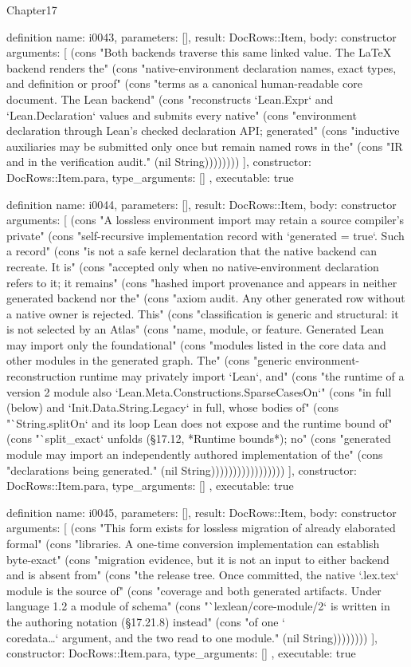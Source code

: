 \begin{lexlean}{Chapter17}
\begin{semanticmodule}
definition{
  name: i0043,
  parameters: [],
  result: DocRows::Item,
  body: constructor{
    arguments: [
      (cons "Both backends traverse this same linked value. The LaTeX backend renders the" (cons "native-environment declaration names, exact types, and definition or proof" (cons "terms as a canonical human-readable core document. The Lean backend" (cons "reconstructs `Lean.Expr` and `Lean.Declaration` values and submits every native" (cons "environment declaration through Lean's checked declaration API; generated" (cons "inductive auxiliaries may be submitted only once but remain named rows in the" (cons "IR and in the verification audit." (nil String))))))))
    ],
    constructor: DocRows::Item.para,
    type_arguments: []
  },
  executable: true
}

definition{
  name: i0044,
  parameters: [],
  result: DocRows::Item,
  body: constructor{
    arguments: [
      (cons "A lossless environment import may retain a source compiler's private" (cons "self-recursive implementation record with `generated = true`. Such a record" (cons "is not a safe kernel declaration that the native backend can recreate. It is" (cons "accepted only when no native-environment declaration refers to it; it remains" (cons "hashed import provenance and appears in neither generated backend nor the" (cons "axiom audit. Any other generated row without a native owner is rejected. This" (cons "classification is generic and structural: it is not selected by an Atlas" (cons "name, module, or feature. Generated Lean may import only the foundational" (cons "modules listed in the core data and other modules in the generated graph. The" (cons "generic environment-reconstruction runtime may privately import `Lean`, and" (cons "the runtime of a version 2 module also `Lean.Meta.Constructions.SparseCasesOn`" (cons "in full (below) and `Init.Data.String.Legacy` in full, whose bodies of" (cons "`String.splitOn` and its loop Lean does not expose and the runtime bound of" (cons "`split_exact` unfolds (§17.12, *Runtime bounds*); no" (cons "generated module may import an independently authored implementation of the" (cons "declarations being generated." (nil String)))))))))))))))))
    ],
    constructor: DocRows::Item.para,
    type_arguments: []
  },
  executable: true
}

definition{
  name: i0045,
  parameters: [],
  result: DocRows::Item,
  body: constructor{
    arguments: [
      (cons "This form exists for lossless migration of already elaborated formal" (cons "libraries. A one-time conversion implementation can establish byte-exact" (cons "migration evidence, but it is not an input to either backend and is absent from" (cons "the release tree. Once committed, the native `.lex.tex` module is the source of" (cons "coverage and both generated artifacts. Under language 1.2 a module of schema" (cons "`lexlean/core-module/2` is written in the authoring notation (§17.21.8) instead" (cons "of one `\\coredata{…}` argument, and the two read to one module." (nil String))))))))
    ],
    constructor: DocRows::Item.para,
    type_arguments: []
  },
  executable: true
}


\end{semanticmodule}
\end{lexlean}
